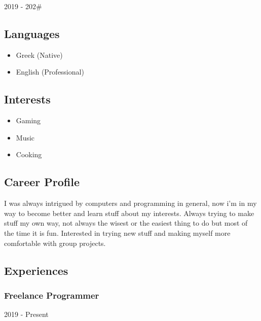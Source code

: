 \documentclass[english,]{article}
\providecommand{\tightlist}{%
  \setlength{\itemsep}{0pt}\setlength{\parskip}{0pt}}
\begin{document}
2019 - 202\#

\hypertarget{languages}{%
\subsection{Languages}\label{languages}}

\begin{itemize}
\tightlist
\item
  Greek {(Native)}
\item
  English {(Professional)}
\end{itemize}

\hypertarget{interests}{%
\subsection{Interests}\label{interests}}

\begin{itemize}
\tightlist
\item
  Gaming
\item
  Music
\item
  Cooking
\end{itemize}

\hypertarget{career-profile}{%
\subsection{\texorpdfstring{{ \emph{} \emph{} } Career
Profile}{    Career Profile}}\label{career-profile}}

I was always intrigued by computers and programming in general, now i'm
in my way to become better and learn stuff about my interests. Always
trying to make stuff my own way, not always the wisest or the easiest
thing to do but most of the time it is fun. Interested in trying new
stuff and making myself more comfortable with group projects.

\hypertarget{experiences}{%
\subsection{\texorpdfstring{{ \emph{} \emph{} }
Experiences}{    Experiences}}\label{experiences}}

\hypertarget{freelance-programmer}{%
\subsubsection{Freelance Programmer}\label{freelance-programmer}}

2019 - Present
\end{document}
